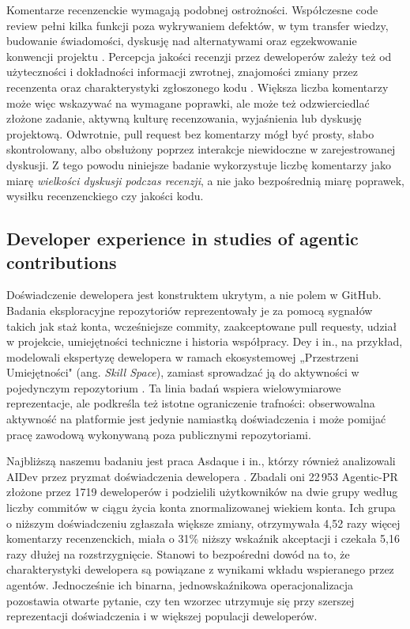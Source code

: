 Komentarze recenzenckie wymagają podobnej ostrożności. Współczesne code review pełni kilka funkcji poza wykrywaniem defektów, w tym transfer wiedzy, budowanie świadomości, dyskusję nad alternatywami oraz egzekwowanie konwencji projektu \cite{bacchelli2013expectations}. Percepcja jakości recenzji przez deweloperów zależy też od użyteczności i dokładności informacji zwrotnej, znajomości zmiany przez recenzenta oraz charakterystyki zgłoszonego kodu \cite{kononenko2016quality}. Większa liczba komentarzy może więc wskazywać na wymagane poprawki, ale może też odzwierciedlać złożone zadanie, aktywną kulturę recenzowania, wyjaśnienia lub dyskusję projektową. Odwrotnie, pull request bez komentarzy mógł być prosty, słabo skontrolowany, albo obsłużony poprzez interakcje niewidoczne w zarejestrowanej dyskusji. Z tego powodu niniejsze badanie wykorzystuje liczbę komentarzy jako miarę \emph{wielkości dyskusji podczas recenzji}, a nie jako bezpośrednią miarę poprawek, wysiłku recenzenckiego czy jakości kodu.

\subsection{Developer experience in studies of agentic contributions}

Doświadczenie dewelopera jest konstruktem ukrytym, a nie polem w GitHub. Badania eksploracyjne repozytoriów reprezentowały je za pomocą sygnałów takich jak staż konta, wcześniejsze commity, zaakceptowane pull requesty, udział w projekcie, umiejętności techniczne i historia współpracy. Dey i in., na przykład, modelowali ekspertyzę dewelopera w ramach ekosystemowej „Przestrzeni Umiejętności" (ang. \emph{Skill Space}), zamiast sprowadzać ją do aktywności w pojedynczym repozytorium \cite{dey2021expertise}. Ta linia badań wspiera wielowymiarowe reprezentacje, ale podkreśla też istotne ograniczenie trafności: obserwowalna aktywność na platformie jest jedynie namiastką doświadczenia i może pomijać pracę zawodową wykonywaną poza publicznymi repozytoriami.

Najbliższą naszemu badaniu jest praca Asdaque i in., którzy również analizowali AIDev przez pryzmat doświadczenia dewelopera \cite{asdaque2026novice}. Zbadali oni 22\,953 Agentic-PR złożone przez 1719 deweloperów i podzielili użytkowników na dwie grupy według liczby commitów w ciągu życia konta znormalizowanej wiekiem konta. Ich grupa o niższym doświadczeniu zgłaszała większe zmiany, otrzymywała 4,52 razy więcej komentarzy recenzenckich, miała o 31\% niższy wskaźnik akceptacji i czekała 5,16 razy dłużej na rozstrzygnięcie. Stanowi to bezpośredni dowód na to, że charakterystyki dewelopera są powiązane z wynikami wkładu wspieranego przez agentów. Jednocześnie ich binarna, jednowskaźnikowa operacjonalizacja pozostawia otwarte pytanie, czy ten wzorzec utrzymuje się przy szerszej reprezentacji doświadczenia i w większej populacji deweloperów.


